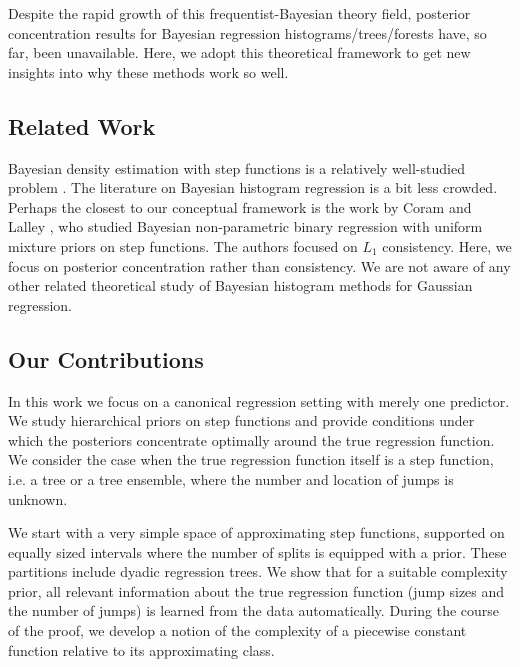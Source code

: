 \documentclass{article}
\newcommand{\1}{\mathbb{I}}
\theoremstyle{assumption}
\begin{document}
Despite the rapid growth of this  frequentist-Bayesian theory field, posterior concentration results for  Bayesian regression histograms/trees/forests have,  so far,  been unavailable.  Here, we adopt  this theoretical framework to get new insights into why these methods work so well.

\vspace{-0.3cm}
\subsection*{Related Work}
Bayesian density estimation with step functions is  a relatively well-studied problem \cite{Castillo_polya,Liu2015,Scricciolo2007}. The literature on Bayesian histogram regression is a bit less crowded. Perhaps the closest to our conceptual framework is the work by Coram and Lalley \cite{coram}, who studied Bayesian non-parametric binary regression with uniform mixture priors on step functions. The authors focused on $L_1$ consistency. Here, we focus on posterior concentration rather than consistency.  We are not aware of any other related theoretical study of Bayesian histogram methods for Gaussian regression.


\vspace{-0.3cm}
\subsection*{Our Contributions}

In this work we focus on a canonical regression setting with merely one predictor. We study hierarchical priors on step functions and provide conditions under which the posteriors concentrate optimally around the true regression function. We consider the case when the true regression function  itself is a step function, i.e. a tree or a tree ensemble, where the number and location of jumps is unknown. 




We start with a very simple space of approximating step functions, supported on equally sized intervals where the number of splits is equipped with a prior. These partitions include dyadic regression trees. %
We show that for a suitable complexity prior, all relevant information about the true regression function (jump sizes and the number of jumps) is learned from the data automatically. During the course of the proof, we develop a notion of the complexity of a piecewise constant function relative to its approximating class.%
\end{document}
